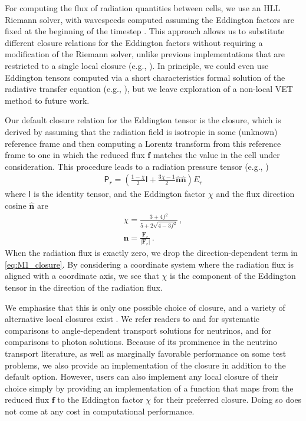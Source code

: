 \documentclass[fleqn,usenatbib]{mnras}
\begin{document}
For computing the flux of radiation quantities between cells, we use an HLL Riemann solver, with wavespeeds computed assuming the Eddington factors are fixed at the beginning of the timestep \citep{Balsara_1999}. This approach allows us to substitute different closure relations for the Eddington factors without requiring a modification of the Riemann solver, unlike previous implementations that are restricted to a single local closure (e.g., \citealt{Gonzalez_2007,Skinner_2013,Skinner_2019}). In principle, we could even use Eddington tensors computed via a short characteristics formal solution of the radiative transfer equation (e.g., \citealt{Davis_2012}), but we leave exploration of a non-local VET method to future work.

Our default closure relation for the Eddington tensor is the \cite{Levermore_1984} closure, which is derived by assuming that the radiation field is isotropic in some (unknown) reference frame and then computing a Lorentz transform from this reference frame to one in which the reduced flux $\mathbf{f}$ matches the value in the cell under consideration. This procedure leads to a radiation pressure tensor (e.g., \citealt{Gonzalez_2007,Rosdahl_2013,Skinner_2013})
\begin{align}
\label{eq:M1_closure}
\mathsf{P}_r = \left( \frac{1 - \chi}{2} \mathsf{I} + \frac{3\chi - 1}{2} \mathbf{\hat n} \mathbf{\hat n} \right) E_r
\end{align}
where $\mathsf{I}$ is the identity tensor, and the Eddington factor $\chi$ and the flux direction cosine $\mathbf{\hat n}$ are
\begin{align}
\chi = \frac{3 + 4f^2}{5 + 2 \sqrt{4 - 3 f^2}} \, , \\
\mathbf{\hat n} = \frac{\mathbf{F}_r}{|\mathbf{F}_r|} \, .
\end{align}
When the radiation flux is exactly zero, we drop the direction-dependent term in \autoref{eq:M1_closure}. By considering a coordinate system where the radiation flux is aligned with a coordinate axis, we see that $\chi$ is the component of the Eddington tensor in the direction of the radiation flux.

We emphasise that this is only one possible choice of closure, and a variety of alternative local closures exist \citep[e.g.,][]{Minerbo_1978,Levermore_1981}. We refer readers to \citet{Janka_1992} and \citet{Koerner_1992} for systematic comparisons to angle-dependent transport solutions for neutrinos, and \citet{Olson_2000} for comparisons to photon solutions. Because of its prominence in the neutrino transport literature, as well as marginally favorable performance on some test problems, we also provide an implementation of the \cite{Minerbo_1978} closure in addition to the default \citet{Levermore_1984} option. However, users can also implement any local closure of their choice simply by providing an implementation of a function that maps from the reduced flux $\mathbf{f}$ to the Eddington factor $\chi$ for their preferred closure. Doing so does not come at any cost in computational performance.
\end{document}
